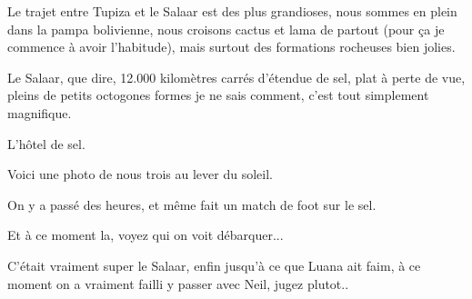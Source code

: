 \begin{multicols}{2}
Le trajet entre Tupiza et le Salaar est des plus grandioses, nous sommes en plein dans la pampa bolivienne, nous croisons cactus et lama de partout (pour ça je commence à avoir l'habitude), mais surtout des formations rocheuses bien jolies.




Le Salaar, que dire, 12.000 kilomètres carrés d'étendue de sel, plat à perte de vue, pleins de petits octogones formes je ne sais comment, c'est tout simplement magnifique.

L'hôtel de sel.


Voici une photo de nous trois au lever du soleil.



On y a passé des heures, et même fait un match de foot sur le sel.


Et à ce moment la, voyez qui on voit débarquer...


C'était vraiment super le Salaar, enfin jusqu'à ce que Luana ait faim, à ce moment on a vraiment failli y passer avec Neil, jugez plutot..


\end{multicols}
